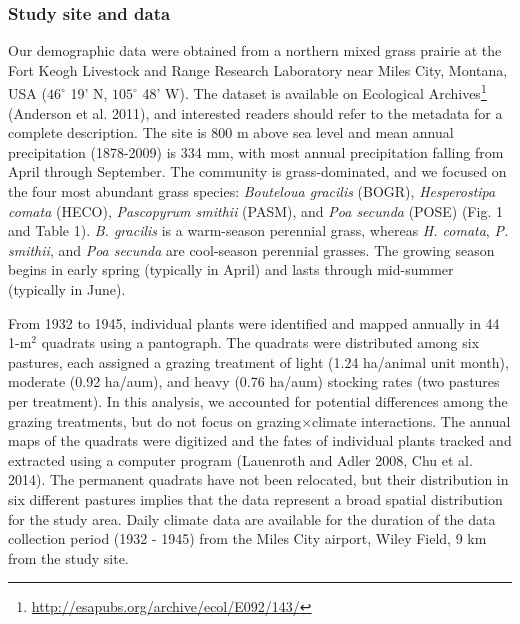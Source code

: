 \documentclass[12pt,]{article}
\let\rmarkdownfootnote\footnote%
\def\footnote{\protect\rmarkdownfootnote}
\begin{document}
\subsubsection{Study site and data}\label{study-site-and-data}

Our demographic data were obtained from a northern mixed grass prairie
at the Fort Keogh Livestock and Range Research Laboratory near Miles
City, Montana, USA (\(46^{\circ}\) 19' N, \(105^{\circ}\) 48' W). The
dataset is available on Ecological Archives\footnote{\url{http://esapubs.org/archive/ecol/E092/143/}}
(Anderson et al. 2011), and interested readers should refer to the
metadata for a complete description. The site is 800 m above sea level
and mean annual precipitation (1878-2009) is 334 mm, with most annual
precipitation falling from April through September. The community is
grass-dominated, and we focused on the four most abundant grass species:
\emph{Bouteloua gracilis} (BOGR), \emph{Hesperostipa comata} (HECO),
\emph{Pascopyrum smithii} (PASM), and \emph{Poa secunda} (POSE) (Fig. 1
and Table 1). \emph{B. gracilis} is a warm-season perennial grass,
whereas \emph{H. comata}, \emph{P. smithii}, and \emph{Poa secunda} are
cool-season perennial grasses. The growing season begins in early spring
(typically in April) and lasts through mid-summer (typically in June).

From 1932 to 1945, individual plants were identified and mapped annually
in 44 1-\(\text{m}^2\) quadrats using a pantograph. The quadrats were
distributed among six pastures, each assigned a grazing treatment of
light (1.24 ha/animal unit month), moderate (0.92 ha/aum), and heavy
(0.76 ha/aum) stocking rates (two pastures per treatment). In this
analysis, we accounted for potential differences among the grazing
treatments, but do not focus on grazing\(\times\)climate interactions.
The annual maps of the quadrats were digitized and the fates of
individual plants tracked and extracted using a computer program
(Lauenroth and Adler 2008, Chu et al. 2014). The permanent quadrats have
not been relocated, but their distribution in six different pastures
implies that the data represent a broad spatial distribution for the
study area. Daily climate data are available for the duration of the
data collection period (1932 - 1945) from the Miles City airport, Wiley
Field, 9 km from the study site.
\end{document}

